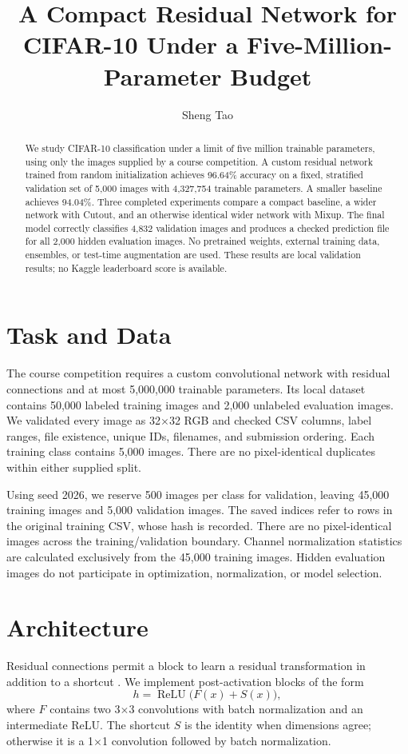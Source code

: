 \documentclass[letterpaper]{article}
\title{A Compact Residual Network for CIFAR-10 Under a Five-Million-Parameter Budget}
\author{Sheng Tao}
\begin{document}
\maketitle

\begin{abstract}
We study CIFAR-10 classification under a limit of five million trainable
parameters, using only the images supplied by a course competition. A custom
residual network trained from random initialization achieves 96.64\% accuracy
on a fixed, stratified validation set of 5,000 images with 4,327,754 trainable
parameters. A smaller baseline achieves 94.04\%. Three completed experiments
compare a compact baseline, a wider network with Cutout, and an otherwise
identical wider network with Mixup. The final model correctly classifies 4,832
validation images and produces a checked prediction file for all 2,000 hidden
evaluation images. No pretrained weights, external training data, ensembles,
or test-time augmentation are used. These results are local validation results;
no Kaggle leaderboard score is available.
\end{abstract}

\section{Task and Data}
The course competition requires a custom convolutional network with residual
connections and at most 5,000,000 trainable parameters. Its local dataset
contains 50,000 labeled training images and 2,000 unlabeled evaluation images.
We validated every image as 32$\times$32 RGB and checked CSV columns, label
ranges, file existence, unique IDs, filenames, and submission ordering. Each
training class contains 5,000 images. There are no pixel-identical duplicates
within either supplied split.

Using seed 2026, we reserve 500 images per class for validation, leaving 45,000
training images and 5,000 validation images. The saved indices refer to rows in
the original training CSV, whose hash is recorded. There are no pixel-identical
images across the training/validation boundary. Channel normalization statistics
are calculated exclusively from the 45,000 training images. Hidden evaluation
images do not participate in optimization, normalization, or model selection.

\section{Architecture}
Residual connections permit a block to learn a residual transformation in
addition to a shortcut \citep{he2016resnet}. We implement post-activation blocks
of the form
\begin{equation}
 h = \operatorname{ReLU}\big(F(x)+S(x)\big),
\end{equation}
where $F$ contains two 3$\times$3 convolutions with batch normalization and an
intermediate ReLU. The shortcut $S$ is the identity when dimensions agree;
otherwise it is a 1$\times$1 convolution followed by batch normalization.
\end{document}
